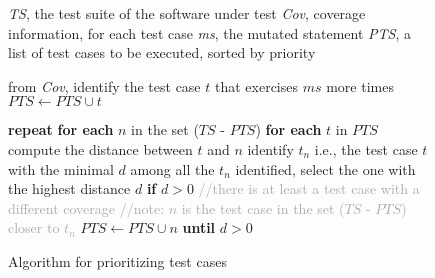 
\newcommand{\INDA}{10}
\newcommand{\INDB}{15}
\newcommand{\INDC}{5}

\begin{figure}[tb]

\begin{algorithmic}[1]

\scriptsize
\Require \emph{TS}, the test suite of the software under test
\Require \emph{Cov}, coverage information, for each test case
\Require \emph{ms}, the mutated statement
\Ensure \emph{PTS}, a list of test cases to be executed, sorted by priority


\State from \emph{Cov}, identify the test case $t$ that exercises $\mathit{ms}$ more times \label{alg:prioritize:first}
\State $\mathit{PTS} \gets \mathit{PTS} \cup t$

\State \textbf{repeat} \label{alg:prioritize:repeat}
\State \hspace{\INDC mm} \textbf{for each} $n$ in the set ($\mathit{TS}$ - $\mathit{PTS}$) \label{alg:prioritize:notSel}
\State \hspace{\INDA mm} \textbf{for each} $t$ in $\mathit{PTS}$
\State \hspace{\INDB mm} compute the distance between $t$ and $n$
\State \hspace{\INDA mm} identify $t_n$ i.e., the test case $t$ with the minimal $d$ \label{alg:prioritize:minD}
\State \hspace{\INDC mm} among all the $t_n$ identified, select the one with the highest distance $d$ \label{alg:prioritize:selectStart}
\State \hspace{\INDC mm} \textbf{if} $d > 0$ \textcolor{darkgray}{//there is at least a test case with a different coverage}
\State \hspace{\INDA mm} \textcolor{darkgray}{//note: $n$ is the test case in the set ($\mathit{TS}$ - $\mathit{PTS}$) closer to $t_n$}
\State \hspace{\INDA mm} $\mathit{PTS} \gets \mathit{PTS} \cup n$ \label{alg:prioritize:selectEnd}
\State \textbf{until} $d > 0$ \label{alg:prioritize:until}


\end{algorithmic}
\vspace{-3mm}
\caption{Algorithm for prioritizing test cases}
\label{alg:prioritize}
\end{figure}


